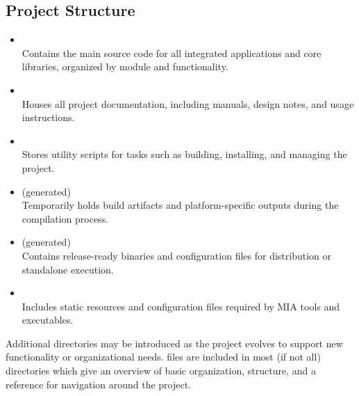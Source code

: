 \subsection{Project Structure}

\begin{itemize}\itemsep0em
	\item {} \hfill \\ 
	Contains the main source code for all integrated applications and core libraries, organized by module and functionality.

	\item {} \hfill \\ 
	Houses all project documentation, including manuals, design notes, and usage instructions.

	\item {} \hfill \\ 
	Stores utility scripts for tasks such as building, installing, and managing the project.

	\item {} (generated) \hfill \\ 
	Temporarily holds build artifacts and platform-specific outputs during the compilation process.

	\item {} (generated) \hfill \\ 
	Contains release-ready binaries and configuration files for distribution or standalone execution.

	\item {} \hfill \\ 
	Includes static resources and configuration files required by MIA tools and executables.
\end{itemize}

Additional directories may be introduced as the project evolves to support new functionality or organizational needs.  files are included in most (if not all) directories which give an overview of basic organization, structure, and a reference for navigation around the project.
